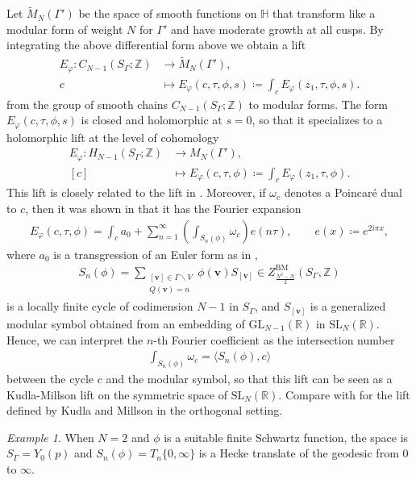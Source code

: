 \documentclass[twoside,a4paper,10pt]{article} %
\newcommand{\Mtil}{\widetilde{M}}
\newcommand{\8}{\infty}
\newcommand{\Z}{\mathbb{Z}}
\newcommand{\vbf}{\mathbf{v}}
\newcommand{\SL}{\mathrm{SL}}
\newcommand{\BM}{\mathrm{BM}}
\newcommand{\GL}{\mathrm{GL}}
\newcommand{\HH}{\mathbb{H}}
\newcommand{\R}{\mathbb{R}}
\theoremstyle{mytheoremstyle}
\theoremstyle{remark}
\newtheorem*{ex}{Example}
\numberwithin{equation}{section}
\begin{document}
Let $\Mtil_{N}(\Gamma')$ be the space of smooth functions on $\HH$ that transform like a modular form of weight $N$ for $\Gamma'$ and have moderate growth at all cusps. By integrating the above differential form above we obtain a lift 
\begin{align}
E_\varphi \colon C_{N-1}(S_\Gamma;\Z) & \longrightarrow \Mtil_{N}(\Gamma'), \\
 c & \longmapsto E_\varphi(c,\tau,\phi,s) \coloneqq \int_c E_\varphi(z_1,\tau,\phi,s).
\end{align}
from the group of smooth chains $C_{N-1}(S_\Gamma;\Z) $ to modular forms. The form $E_\varphi(c,\tau,\phi,s)$ is closed and holomorphic at $s=0$, so that it specializes to a holomorphic lift at the level of cohomology
\begin{align} \label{cohom lift}
E_\varphi \colon H_{N-1}(S_\Gamma;\Z) & \longrightarrow M_{N}(\Gamma'),\\
 [c] & \longmapsto E_\varphi(c,\tau,\phi) \coloneqq \int_c E_\varphi(z_1,\tau,\phi).
\end{align}
This lift is closely related to the lift in \cite{bcg,bcgcrm}. Moreover, if $\omega_c$ denotes a Poincaré dual to $c$, then it was shown in \cite{rbrsln} that it has the Fourier expansion
\begin{align}
E_\varphi(c,\tau,\phi)=\int_c a_0 + \sum_{n=1}^\8 \left (\int_{S_n(\phi)}\omega_c \right )e(n \tau), \qquad e(x)\coloneqq e^{2i \pi x},
\end{align}
where $a_0$ is a transgression of an Euler form as in \cite{bcg},
\begin{align} \label{special cycles}
S_n(\phi)=\sum_{\substack{[\vbf] \in \Gamma \backslash V \\ Q(\vbf)=n}} \phi(\vbf)S_{[\vbf]} \in Z^{\BM}_{\frac{N^2-N}{2}}(S_\Gamma, \Z)
\end{align}
is a locally finite cycle of codimension $N-1$ in $S_\Gamma$, and $S_{[\vbf]}$ is a generalized modular symbol obtained from an embedding of $\GL_{N-1}(\R)$ in $\SL_N(\R)$. Hence, we can interpret the $n$-th Fourier coefficient as the intersection number
\begin{align}
\int_{S_n(\phi)}\omega_c=\langle S_n(\phi), c \rangle
\end{align} between the cycle $c$ and the modular symbol, so that this lift can be seen as a Kudla-Millson lift on the symmetric space of $\SL_N(\R)$. Compare with \cite{km86,km87,KMIHES} for the lift defined by Kudla and Millson in the orthogonal setting.

\begin{ex}When $N=2$ and $\phi$ is a suitable finite Schwartz function, the space is $S_\Gamma=Y_0(p)$ and $S_n(\phi)=T_n\{0,\8\}$ is a Hecke translate of the geodesic from $0$ to $\8$.
\end{ex}
\end{document}
